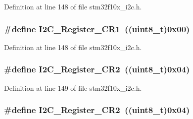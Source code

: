 Definition at line 148 of file stm32f10x\+\_\+i2c.\+h.

\subsubsection[{\texorpdfstring{I2\+C\+\_\+\+Register\+\_\+\+C\+R1}{I2C_Register_CR1}}]{\setlength{\rightskip}{0pt plus 5cm}\#define I2\+C\+\_\+\+Register\+\_\+\+C\+R1~(({\bf uint8\+\_\+t})0x00)}\hypertarget{group___i2_c__registers_ga4b9e7934e490c3540e50cf2f1d0a7688}{}\label{group___i2_c__registers_ga4b9e7934e490c3540e50cf2f1d0a7688}


Definition at line 148 of file stm32f10x\+\_\+i2c.\+h.

\subsubsection[{\texorpdfstring{I2\+C\+\_\+\+Register\+\_\+\+C\+R2}{I2C_Register_CR2}}]{\setlength{\rightskip}{0pt plus 5cm}\#define I2\+C\+\_\+\+Register\+\_\+\+C\+R2~(({\bf uint8\+\_\+t})0x04)}\hypertarget{group___i2_c__registers_gaf278337dd03b6ae56eac3f335381eca3}{}\label{group___i2_c__registers_gaf278337dd03b6ae56eac3f335381eca3}


Definition at line 149 of file stm32f10x\+\_\+i2c.\+h.

\subsubsection[{\texorpdfstring{I2\+C\+\_\+\+Register\+\_\+\+C\+R2}{I2C_Register_CR2}}]{\setlength{\rightskip}{0pt plus 5cm}\#define I2\+C\+\_\+\+Register\+\_\+\+C\+R2~(({\bf uint8\+\_\+t})0x04)}\hypertarget{group___i2_c__registers_gaf278337dd03b6ae56eac3f335381eca3}{}\label{group___i2_c__registers_gaf278337dd03b6ae56eac3f335381eca3}


